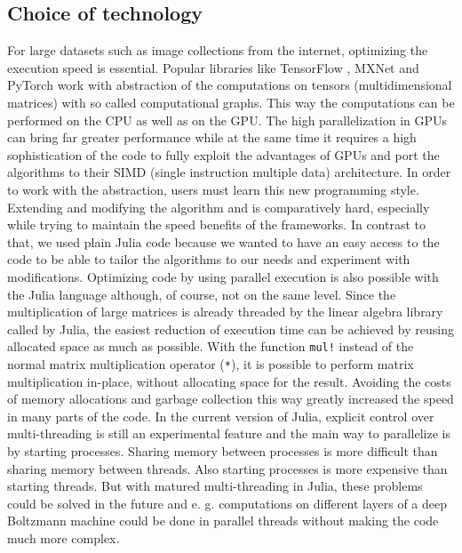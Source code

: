 \documentclass[12pt]{article}
\newcommand{\inlinecode}[1]{\texttt{#1}}
\begin{document}
\subsection{Choice of technology}
For large datasets such as image collections from the internet, optimizing the execution speed is essential.
Popular libraries like TensorFlow \citep{abadi2016tensorflow}, MXNet \citep{mxnet} and PyTorch \citep{pytorch} work with abstraction of the computations on tensors (multidimensional matrices) with so called computational graphs.
This way the computations can be performed on the CPU as well as on the GPU.
The high parallelization in GPUs can bring far greater performance while at the same time it requires a high sophistication of the code to fully exploit the advantages of GPUs and port the algorithms to their SIMD (single instruction multiple data) architecture.
In order to work with the abstraction, users must learn this new programming style. Extending and modifying the algorithm and is comparatively hard, especially while trying to maintain the speed benefits of the frameworks.
In contrast to that, we used plain Julia code because we wanted to have an easy access to the code to be able to tailor the algorithms to our needs and experiment with modifications.
Optimizing code by using parallel execution is also possible with the Julia language although, of course, not on the same level.
Since the multiplication of large matrices is already threaded by the linear algebra library called by Julia,
the easiest reduction of execution time can be achieved by reusing allocated space as much as possible.
With the function \inlinecode{mul!} instead of the normal matrix multiplication operator (\inlinecode{*}), it is possible to perform matrix multiplication in-place, without allocating space for the result. Avoiding the costs of memory allocations and garbage collection this way greatly increased the speed in many parts of the code.
In the current version of Julia, explicit control over multi-threading is still an experimental feature and the main way to parallelize is by starting processes.
Sharing memory between processes is more difficult than sharing memory between threads. Also starting processes is more expensive than starting threads.
But with matured multi-threading in Julia, these problems could be solved in the future and e. g. computations on different layers of a deep Boltzmann machine could be done in parallel threads without making the code much more complex.

\end{document}
